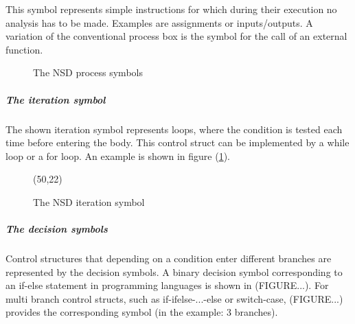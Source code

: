 \documentclass{report}
\begin{document}
This symbol represents simple instructions for which during their execution no analysis has to be made. Examples are assignments or inputs/outputs. 
A variation of the conventional process box is the symbol for the call of an external function.
\begin{figure}
\centering
{}
\caption{The NSD process symbols }
\end{figure}


%  
% 

\subparagraph{The iteration symbol}
The shown iteration symbol represents loops, where the condition is tested each time before entering the body. This control struct can be implemented by a while loop or a for loop. An example is shown in figure (\ref{NSD_whileLoop}).

\begin{figure}[H]
\centering
\label{NSD_whileLoop}
\begin{struktogramm}(50,22)
\whileend
\end{struktogramm}

\caption{The NSD iteration symbol }
\end{figure}

\subparagraph{The decision symbols}
Control structures that depending on a condition enter different branches are represented by the decision symbols. A binary decision symbol corresponding to an if-else statement in programming languages is shown in (FIGURE...). For multi branch control structs, such as if-ifelse-...-else or switch-case, (FIGURE...) provides the corresponding symbol (in the example: 3 branches).
 
\end{document}
